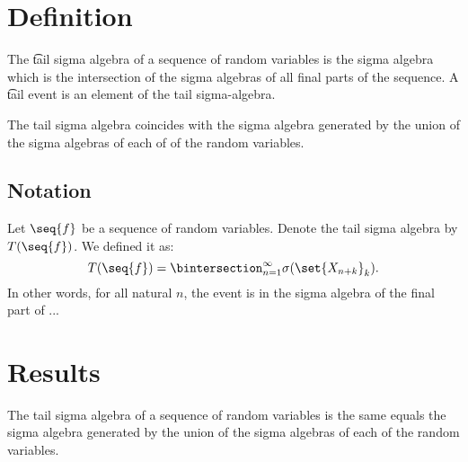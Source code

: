 
\section*{Definition}

The \t{tail sigma algebra} of a sequence of random variables is the sigma algebra which is the intersection of the sigma algebras of all final parts of the sequence.
A \t{tail event} is an element of the tail sigma-algebra.

The tail sigma algebra coincides with the sigma algebra generated by the union of the sigma algebras of each of of the random variables.

\subsection*{Notation}

Let $\seq{f}$ be a sequence of random variables.
Denote the tail sigma algebra by $T(\seq{f})$.
We defined it as:
  \[
T(\seq{f}) = \bintersection_{n = 1}^{\infty} \sigma (\set{X_{n+k}}_k).
  \]
In other words, for all natural $n$, the event is in the sigma algebra of the final part of ...

\section*{Results}

\begin{proposition}The tail sigma algebra of a sequence of random variables is the same equals the sigma algebra generated by the union of the sigma algebras of each of the random variables.\end{proposition}

\blankpage